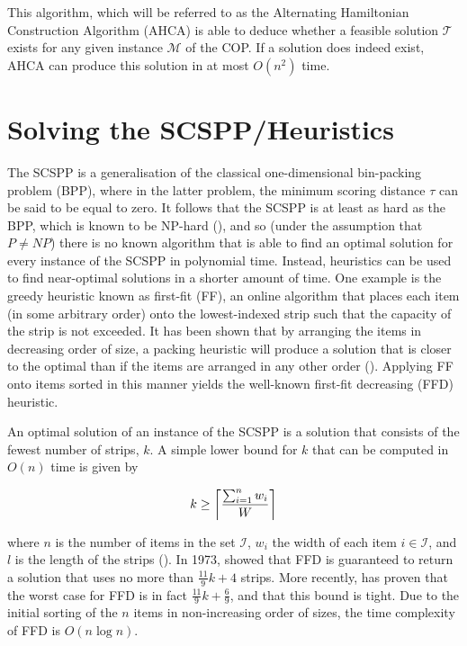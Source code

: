\documentclass[oribibl]{llncs}
\begin{document}
This algorithm, which will be referred to as the Alternating Hamiltonian Construction Algorithm (AHCA) is able to deduce whether a feasible solution $\mathcal{T}$ exists for any given instance $\mathcal{M}$ of the COP. If a solution does indeed exist, AHCA can produce this solution in at most $O(n^2)$ time.

\section{Solving the SCSPP/Heuristics}
\label{sec:scsppsoln}
The SCSPP is a generalisation of the classical one-dimensional bin-packing problem (BPP), where in the latter problem, the minimum scoring distance $\tau$ can be said to be equal to zero. It follows that the SCSPP is at least as hard as the BPP, which is known to be NP-hard (\citealp{garey1979}), and so (under the assumption that $P \neq NP$) there is no known algorithm that is able to find an optimal solution for every instance of the SCSPP in polynomial time. Instead, heuristics can be used to find near-optimal solutions in a shorter amount of time. One example is the greedy heuristic known as first-fit (FF), an online algorithm that places each item (in some arbitrary order) onto the lowest-indexed strip such that the capacity of the strip is not exceeded. It has been shown that by arranging the items in decreasing order of size, a packing heuristic will produce a solution that is closer to the optimal than if the items are arranged in any other order (\citealp{johnson1974fast}). Applying FF onto items sorted in this manner yields the well-known first-fit decreasing (FFD) heuristic.

An optimal solution of an instance of the SCSPP is a solution that consists of the fewest number of strips, $k$. A simple lower bound for $k$ that can be computed in $O(n)$ time is given by

\begin{equation}
	\label{eqn:lowerbound}
	k \geq \ceil*{\frac{\sum_{i=1}^{n}w_i}{W}}
\end{equation}

where $n$ is the number of items in the set $\mathcal{I}$, $w_i$ the width of each item $i \in \mathcal{I}$, and $l$ is the length of the strips (\citealp{martello1990b}). In 1973, \citeauthor{johnson1973} showed that FFD is guaranteed to return a solution that uses no more than $\frac{11}{9}k + 4$ strips. More recently, \cite{dosa2007} has proven that the worst case for FFD is in fact $\frac{11}{9}k + \frac{6}{9}$, and that this bound is tight. Due to the initial sorting of the $n$ items in non-increasing order of sizes, the time complexity of FFD is $O(n\log n)$.
\end{document}
